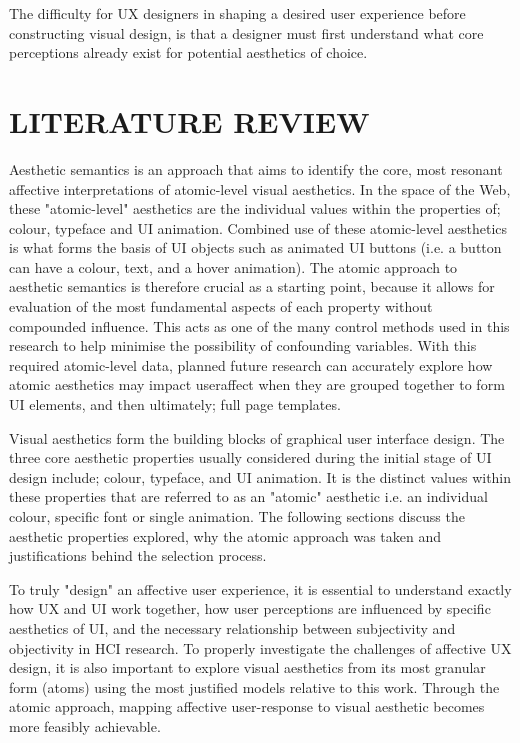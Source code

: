 \documentclass[10pt]{article}
\begin{document}
The difficulty for UX designers in shaping a desired user experience before constructing visual design, is that a designer must first understand what core perceptions already exist for potential aesthetics of choice.

\section{LITERATURE REVIEW}
Aesthetic semantics is an approach that aims to identify the core, most resonant affective interpretations of atomic-level visual aesthetics. In the space of the Web, these "atomic-level" aesthetics are the individual values within the properties of; colour, typeface and UI animation. Combined use of these atomic-level aesthetics is what forms the basis of UI objects such as animated UI buttons (i.e. a button can have a colour, text, and a hover animation). The atomic approach to aesthetic semantics is therefore crucial as a starting point, because it allows for evaluation of the most fundamental aspects of each property without compounded influence. This acts as one of the many control methods used in this research to help minimise the possibility of confounding variables. With this required atomic-level data, planned future research can accurately explore how atomic aesthetics may impact useraffect when they are grouped together to form UI elements, and then ultimately; full page templates.

Visual aesthetics form the building blocks of graphical user interface design. The three core aesthetic properties usually considered during the initial stage of UI design include; colour, typeface, and UI animation. It is the distinct values within these properties that are referred to as an "atomic" aesthetic i.e. an individual colour, specific font or single animation. The following sections discuss the aesthetic properties explored, why the atomic approach was taken and justifications behind the selection process.

To truly "design" an affective user experience, it is essential to understand exactly how UX and UI work together, how user perceptions are influenced by specific aesthetics of UI, and the necessary relationship between subjectivity and objectivity in HCI research. To properly investigate the challenges of affective UX design, it is also important to explore visual aesthetics from its most granular form (atoms) using the most justified models relative to this work. Through the atomic approach, mapping affective user-response to visual aesthetic becomes more feasibly achievable.
\end{document}
